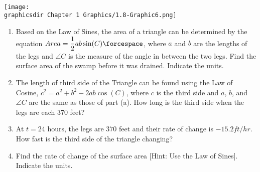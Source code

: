  \\[11pt]
\begin{minipage}{0.49\textwidth}
    \vspace{-11pt} %
    \texttt{[image: \\graphicsdir Chapter 1 Graphics/1.8-Graphic6.png]}
    \vspace{22pt}
    \begin{center}
    \end{center}
\end{minipage} \hfill \begin{minipage}{0.5\textwidth} \vspace{0pt}%
    \begin{enumerate}[label=\hspace{11pt}(\alph*), align=left, leftmargin=*, labelsep=0.25em, itemsep=1em]
        \item Based on the Law of Sines, the area of a triangle can be determined by the equation $Area = \dfrac{1}{2}ab\sin (C) \forcespace$, where $a$ and $b$ are the lengths of the legs and $\angle C$ is the measure of the angle in between the two legs. Find the surface area of the swamp before it was drained. Indicate the units.
        \item The length of third side of the Triangle can be found using the Law of Cosine, $c^2 = a^2 + b^2 - 2ab\cos(C)$, where $c$ is the third side and $a$, $b$, and $\angle C$ are the same as those of part (a). How long is the third side when the legs are each $370$ feet?
        \item At $t = 24$ hours, the legs are $370$ feet and their rate of change is $-15.2 \si{ft \per hr}$. How fast is the third side of the triangle changing?
        \item Find the rate of change of the surface area [Hint: Use the Law of Sines]. Indicate the units.
    \end{enumerate} \vspace{11pt}
\end{minipage}
